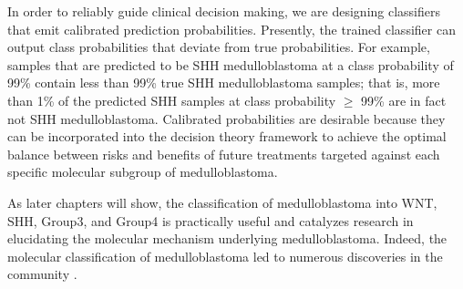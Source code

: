 In order to reliably guide clinical decision making, we are designing classifiers that emit calibrated prediction probabilities. Presently, the trained classifier can output class probabilities that deviate from true probabilities. For example, samples that are predicted to be SHH medulloblastoma at a class probability of 99\% contain less than 99\% true SHH medulloblastoma samples; that is, more than 1\% of the predicted SHH samples at class probability $\ge$ 99\% are in fact not SHH medulloblastoma. Calibrated probabilities are desirable because they can be incorporated into the decision theory framework to achieve the optimal balance between risks and benefits of future treatments targeted against each specific molecular subgroup of medulloblastoma.

As later chapters will show, the classification of medulloblastoma into WNT, SHH, Group3, and Group4 is practically useful and catalyzes research in elucidating the molecular mechanism underlying medulloblastoma. Indeed, the molecular classification of medulloblastoma led to numerous discoveries in the community .


\clearpage
